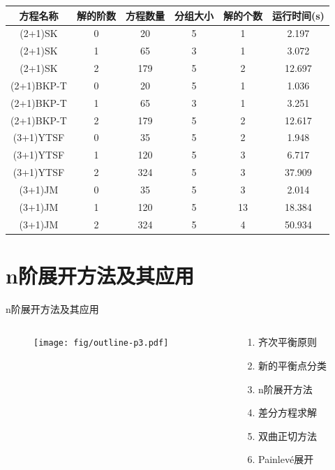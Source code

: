 \documentclass{beamer}
\newcommand{\Painleve}{Painlev{\'e}}
\begin{document}
\begin{frame}

\begin{adjustbox}{max width=\textwidth}
\renewcommand{\arraystretch}{1.3}
\begin{tabular}{cccccc}
\hline
方程名称    & 解的阶数 & 方程数量 & 分组大小 & 解的个数 & 运行时间(s) \\ 
\hline 
(2+1)SK & 0 & 20 & 5 & 1 & 2.197 \\
(2+1)SK & 1 & 65 & 3 & 1 & 3.072 \\
(2+1)SK & 2 & 179 & 5 & 2 & 12.697 \\
(2+1)BKP-T & 0 & 20 & 5 & 1 & 1.036 \\
(2+1)BKP-T & 1 & 65 & 3 & 1 & 3.251 \\
(2+1)BKP-T & 2 & 179 & 5 & 2 & 12.617 \\
(3+1)YTSF & 0 & 35 & 5 & 2 & 1.948 \\
(3+1)YTSF & 1 & 120 & 5 & 3 & 6.717 \\
(3+1)YTSF & 2 & 324 & 5 & 3 & 37.909 \\
(3+1)JM & 0 & 35 & 5 & 3 & 2.014 \\
(3+1)JM & 1 & 120 & 5 & 13 & 18.384 \\
(3+1)JM & 2 & 324 & 5 & 4 & 50.934 \\
\hline 
\end{tabular}
\end{adjustbox}

\end{frame}

\section{n阶展开方法及其应用}
\begin{frame}{n阶展开方法及其应用}
\begin{columns}
\begin{column}{0.5\textwidth}
  \begin{figure}
    \centering
    \texttt{[image: fig/outline-p3.pdf]}
  \end{figure}
\end{column}
\begin{column}{0.5\textwidth}
  \begin{enumerate}
  \item 齐次平衡原则
  \item 新的平衡点分类
  \item n阶展开方法
  \item 差分方程求解
  \item 双曲正切方法 
  \item \Painleve{}展开
  \end{enumerate}
\end{column}
\end{columns}
\end{frame}
\end{document}
